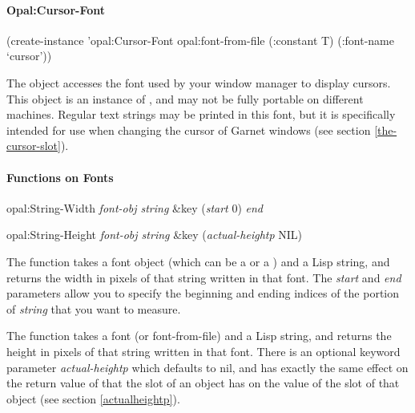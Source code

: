 \begin{group}
\paragraph{Opal:Cursor-Font}

\begin{programexample}
(create-instance 'opal:Cursor-Font opal:font-from-file
  (:constant T)
  (:font-name `cursor'))
\end{programexample}

The  object accesses the
font used by your window manager to display cursors.  This object is an
instance of , and may not be fully portable on
different machines.  Regular text strings may be printed in this font, but
it is specifically intended for use when changing the cursor of Garnet
windows (see section \ref{the-cursor-slot}).
\end{group}



\paragraph{Functions on Fonts}

\begin{programexample}
opal:String-Width {\it font-obj string} \&key ({\it start} 0) {\it end}\value{function}

opal:String-Height {\it font-obj string} \&key ({\it actual-heightp} NIL)\value{function}
\end{programexample}
The function  takes a font object (which can be a
 or a ) and a Lisp string, and
returns the width in pixels of that string written in that font.
The {\it start} and {\it end} parameters allow you to specify the beginning and
ending indices of the portion of {\it string} that you want to measure.

The function  takes a font (or font-from-file) and a Lisp
string, and returns the height in pixels of that string written in that
font.  There is an optional keyword parameter {\it actual-heightp} which
defaults to {\sc nil}, and has exactly the same effect on the return value of
 that the  slot of an 
object has on the value of the  slot of that 
object (see section \ref{actualheightp}).

